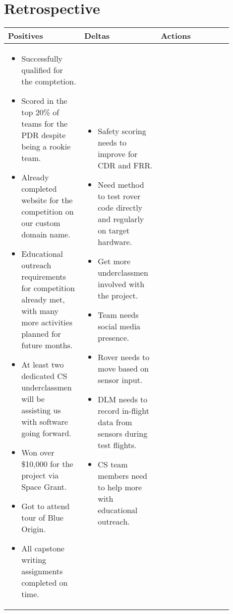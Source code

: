 \documentclass[onecolumn, draftclsnofoot,10pt, compsoc]{IEEEtran}
\newenvironment{myitemize}
{ \begin{itemize}
    \setlength{\itemsep}{0pt}
    \setlength{\parskip}{0pt}
    \setlength{\parsep}{0pt}     }
{ \end{itemize}                  }
\begin{document}
\section{Retrospective}
\begin{singlespacing}
\begin{tabular} {p{0.3\linewidth} p{0.3\linewidth} p{0.3\linewidth}} \textbf{Positives} & \textbf{Deltas} & \textbf{Actions}\\\hline
\vspace{-\baselineskip}\begin{myitemize}
\item Successfully qualified for the comptetion.
\item Scored in the top 20\% of teams for the PDR despite being a rookie team.
\item Already completed website for the competition on our custom domain name.
\item Educational outreach requirements for competition already met, with many more activities planned for future months.
\item At least two dedicated CS underclassmen will be assisting us with software going forward.
\item Won over \$10,000 for the project via Space Grant.
\item Got to attend tour of Blue Origin.
\item All capstone writing assignments completed on time.
\vspace{-\baselineskip}\end{myitemize} & 
\vspace{-\baselineskip}\begin{myitemize}
\item Safety scoring needs to improve for CDR and FRR.
\item Need method to test rover code directly and regularly on target hardware.
\item Get more underclassmen involved with the project.
\item Team needs social media presence.
\item Rover needs to move based on sensor input.
\item DLM needs to record in-flight data from sensors during test flights.
\item CS team members need to help more with educational outreach.
\vspace{-\baselineskip}\end{myitemize} & 
\vspace{-\baselineskip}\begin{myitemize}

\end{myitemize}
\end{tabular}
\end{singlespacing}
\end{document}
